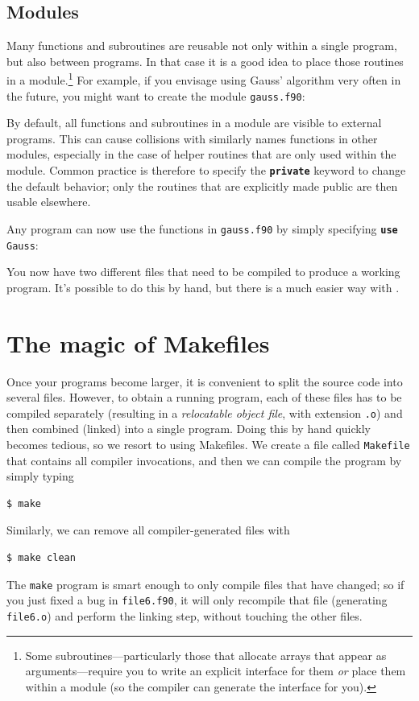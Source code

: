 \documentclass[openany,oneside]{report}
\newcommand{\keyword}[1]{\texttt{\bfseries\color{DarkBlue}#1}}
\begin{document}
\section{Modules}

Many functions and subroutines are reusable not only within a single program, but also between programs.
In that case it is a good idea to place those routines in a module.\footnote{Some subroutines---particularly those that allocate arrays that appear as arguments---require you to write an explicit interface for them \emph{or} place them within a module (so the compiler can generate the interface for you).}
For example, if you envisage using Gauss' algorithm very often in the future, you might want to create the module \texttt{gauss.f90}:

By default, all functions and subroutines in a module are visible to external programs.
This can cause collisions with similarly names functions in other modules, especially in the case of helper routines that are only used within the module.
Common practice is therefore to specify the \keyword{private} keyword to change the default behavior; only the routines that are explicitly made public are then usable elsewhere.

Any program can now use the functions in \texttt{gauss.f90} by simply specifying \texttt{\keyword{use} Gauss}:

You now have two different files that need to be compiled to produce a working program.
It's possible to do this by hand, but there is a much easier way with .

\chapter{The magic of Makefiles}
\label{chap:Makefiles}

Once your programs become larger, it is convenient to split the source code into several files.
However, to obtain a running program, each of these files has to be compiled separately (resulting in a \emph{relocatable object file}, with extension \texttt{.o}) and then combined (linked) into a single program.
Doing this by hand quickly becomes tedious, so we resort to using Makefiles.
We create a file called \texttt{Makefile} that contains all compiler invocations, and then we can compile the program by simply typing
\begin{verbatim}
$ make
\end{verbatim}
Similarly, we can remove all compiler-generated files with
\begin{verbatim}
$ make clean
\end{verbatim}
The \texttt{make} program is smart enough to only compile files that have changed; so if you just fixed a bug in \texttt{file6.f90}, it will only recompile that file (generating \texttt{file6.o}) and perform the linking step, without touching the other files.
\end{document}
